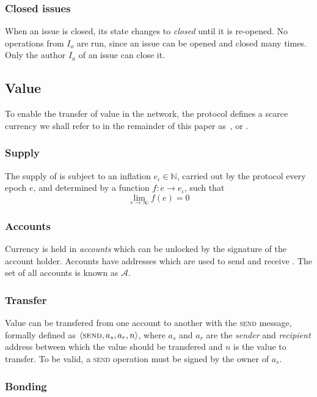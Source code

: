 \subsubsection{Closed issues} When an issue is closed, its state changes to
\emph{closed} until it is re-opened. No operations from $I_o$ are run, since
an issue can be opened and closed many times. Only the author $I_a$ of an issue
can close it.

\subsection{Value}

To enable the transfer of value in the network, the protocol defines a scarce
currency we shall refer to in the remainder of this paper as~\coin{}, or
\oscoin{}.

\subsubsection{Supply}

The supply of \coin{} is subject to an inflation $e_{\iota} \in \mathbb{N}$,
carried out by the protocol every epoch $e$, and determined by a function $f :
e \to e_{\iota}$, such that
\[
    \lim_{e\to\infty} f(e) = 0
\]

\subsubsection{Accounts}
\label{accounts}

Currency is held in \emph{accounts} which can be unlocked by the signature of
the account holder. Accounts have addresses which are used to send and receive
\coin{}. The set of all accounts is known as $\mathcal{A}$.

\subsubsection{Transfer}

Value can be transfered from one account to another with the \textsc{send}
message, formally defined as $\langle \text{\normalfont\scshape send}, a_{s}, a_{r}, n \rangle$, where $a_{s}$ and
$a_{r}$ are the \emph{sender} and \emph{recipient} address between which the
value should be transfered and $n$ is the value to transfer.  To be valid, a
\textsc{send} operation must be signed by the owner of $a_{s}$.

\subsubsection{Bonding}

